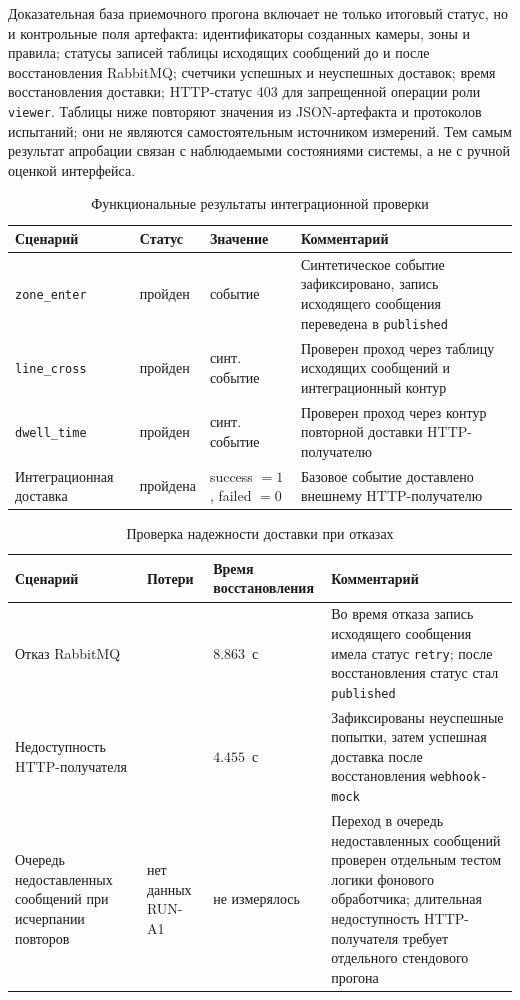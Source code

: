 Доказательная база приемочного прогона включает не только итоговый статус, но и контрольные поля артефакта: идентификаторы созданных камеры, зоны и правила; статусы записей таблицы исходящих сообщений до и после восстановления RabbitMQ; счетчики успешных и неуспешных доставок; время восстановления доставки; HTTP-статус 403 для запрещенной операции роли \texttt{viewer}. Таблицы ниже повторяют значения из JSON-артефакта и протоколов испытаний; они не являются самостоятельным источником измерений. Тем самым результат апробации связан с наблюдаемыми состояниями системы, а не с ручной оценкой интерфейса.

\begin{table}[H]
\caption{Функциональные результаты интеграционной проверки}
\label{tab:e2e_results}
\begin{tabularx}{\textwidth}{@{}>{\raggedright\arraybackslash}p{}>{\raggedright\arraybackslash}p{}>{\raggedright\arraybackslash}p{}>{\raggedright\arraybackslash}X@{}}
\toprule
Сценарий & Статус & Значение & Комментарий \\
\midrule
\texttt{zone\_enter} & пройден & 1 событие & Синтетическое событие зафиксировано, запись исходящего сообщения переведена в \texttt{published} \\
\texttt{line\_cross} & пройден & синт. событие & Проверен проход через таблицу исходящих сообщений и интеграционный контур \\
\texttt{dwell\_time} & пройден & синт. событие & Проверен проход через контур повторной доставки HTTP-получателю \\
Интеграционная доставка & пройдена & success \(=1\), failed \(=0\) & Базовое событие доставлено внешнему HTTP-получателю \\
\bottomrule
\end{tabularx}
\end{table}

\begin{table}[H]
\caption{Проверка надежности доставки при отказах}
\label{tab:reliability_results}
\begin{tabularx}{\textwidth}{>{\raggedright\arraybackslash}p{}>{\raggedright\arraybackslash}p{}>{\raggedright\arraybackslash}p{}>{\raggedright\arraybackslash}X}
\toprule
Сценарий & Потери & Время восстановления & Комментарий \\
\midrule
Отказ RabbitMQ & 0 & \(8.863\)~с & Во время отказа запись исходящего сообщения имела статус \texttt{retry}; после восстановления статус стал \texttt{published} \\
Недоступность HTTP-получателя & 0 & \(4.455\)~с & Зафиксированы неуспешные попытки, затем успешная доставка после восстановления \texttt{webhook-mock} \\
Очередь недоставленных сообщений при исчерпании повторов & нет данных RUN-A1 & не измерялось & Переход в очередь недоставленных сообщений проверен отдельным тестом логики фонового обработчика; длительная недоступность HTTP-получателя требует отдельного стендового прогона \\
\bottomrule
\end{tabularx}
\end{table}


